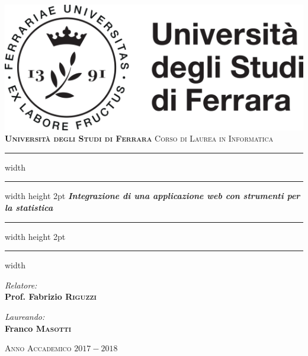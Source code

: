 \documentclass[10pt,titlepage,twoside,a4paper]{report}
\begin{document}

\begin{titlepage}
    \centering
    \vspace*{20mm}
    \includegraphics[]{logo.png}\\
    \vspace*{1cm}
    \huge \textbf{\textsc{Università degli Studi di Ferrara}}
    \Large \textsc{Corso di Laurea in Informatica}

    \vspace*{1.5cm}
    \hrule width \hsize \kern 1mm \hrule width \hsize height 2pt
    \vspace*{10mm}
    \Huge \emph{\textbf{Integrazione di una applicazione web con strumenti per la statistica}}
    \vspace*{10mm}
    \hrule width \hsize height 2pt
    \vspace*{1mm}
    \hrule width \hsize \kern 1mm

    \vspace*{15mm}
    \begin{minipage}{0.45\textwidth}
        \begin{flushleft} \Large
            \emph{Relatore:}\\
            \Large \textbf{Prof. Fabrizio \textsc{Riguzzi}}
        \end{flushleft}
    \end{minipage}
    \begin{minipage}{0.45\textwidth}
        \begin{flushright} \Large
            \emph{Laureando:} \\
            \Large \textbf{Franco \textsc{Masotti}}
        \end{flushright}
    \end{minipage}

    \vspace*{20mm}
    \Large \textsc{Anno Accademico $2017-2018$}
\end{titlepage}
\end{document}
